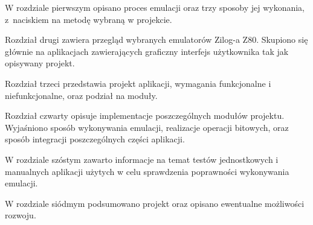 	W rozdziale pierwszym opisano proces emulacji oraz trzy sposoby jej wykonania, z~naciskiem na metodę wybraną w projekcie.
	
	Rozdział drugi zawiera przegląd wybranych emulatorów Zilog-a Z80. Skupiono się głównie na aplikacjach zawierających graficzny interfejs użytkownika tak jak opisywany projekt. 
    
    Rozdział trzeci przedstawia projekt aplikacji, wymagania funkcjonalne i niefunkcjonalne, oraz podział na moduły.
	
	Rozdział czwarty opisuje implementacje poszczególnych modułów projektu. Wyjaśniono sposób wykonywania emulacji, realizacje operacji bitowych, oraz sposób integracji poszczególnych części aplikacji.
	
	
	W rozdziale szóstym zawarto informacje na temat testów jednostkowych i manualnych aplikacji użytych w celu sprawdzenia poprawności wykonywania emulacji.
	
	W rozdziale siódmym podsumowano projekt oraz opisano ewentualne możliwości rozwoju.